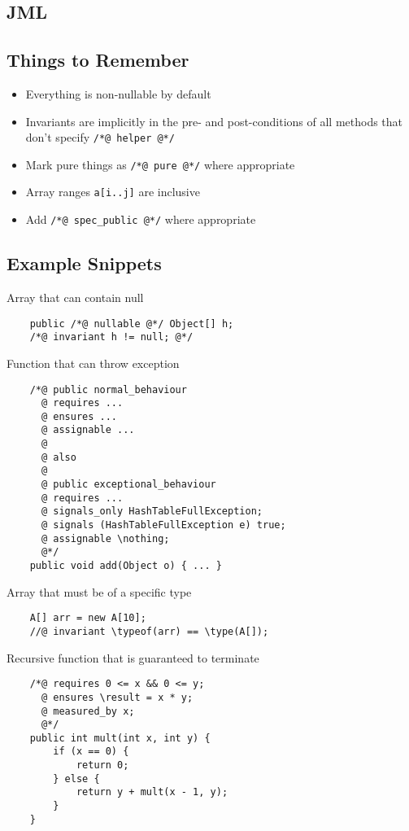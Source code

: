 \documentclass[landscape]{cheat}
\begin{document}
\begin{multicols*}{3}
\section{JML}
\subsection{Things to Remember}
\begin{itemize}
    \item Everything is non-nullable by default
    \item Invariants are implicitly in the pre- and post-conditions of all methods that don't specify \texttt{/*@ helper @*/}
    \item Mark pure things as \texttt{/*@ pure @*/} where appropriate
    \item Array ranges \texttt{a[i..j]} are inclusive
    \item Add \texttt{/*@ spec\_public @*/} where appropriate
\end{itemize}

\subsection{Example Snippets}
Array that can contain null
\begin{lstlisting}
    public /*@ nullable @*/ Object[] h;
    /*@ invariant h != null; @*/
\end{lstlisting}

Function that can throw exception
\begin{lstlisting}
    /*@ public normal_behaviour
      @ requires ...
      @ ensures ...
      @ assignable ...
      @
      @ also
      @
      @ public exceptional_behaviour
      @ requires ...
      @ signals_only HashTableFullException;
      @ signals (HashTableFullException e) true;
      @ assignable \nothing;
      @*/
    public void add(Object o) { ... }
\end{lstlisting}

Array that must be of a specific type
\begin{lstlisting}
    A[] arr = new A[10];
    //@ invariant \typeof(arr) == \type(A[]);
\end{lstlisting}

Recursive function that is guaranteed to terminate
\begin{lstlisting}
    /*@ requires 0 <= x && 0 <= y;
      @ ensures \result = x * y;
      @ measured_by x;
      @*/
    public int mult(int x, int y) {
        if (x == 0) {
            return 0;
        } else {
            return y + mult(x - 1, y);
        }
    }
\end{lstlisting}


\end{multicols*}
\end{document}
